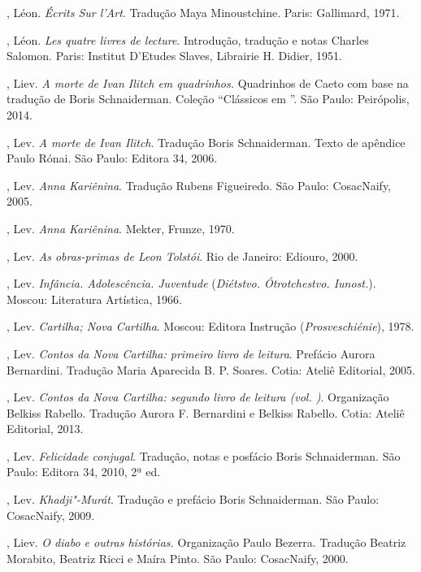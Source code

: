 \begin{Parskip}
{, Léon. \emph{Écrits Sur l'Art}. Tradução Maya Minoustchine. Paris:
Gallimard, 1971.

, Léon. \emph{Les quatre livres de lecture}. Introdução, tradução e notas Charles Salomon. Paris: Institut D'Etudes Slaves, Librairie H. Didier, 1951.

, Liev. \emph{A morte de Ivan Ilitch em quadrinhos.} Quadrinhos de Caeto com base na
tradução de Boris Schnaiderman. Coleção ``Clássicos em ''. São Paulo: Peirópolis, 2014.

, Lev. \emph{A morte de Ivan Ilitch}. Tradução Boris Schnaiderman. Texto de apêndice
Paulo Rónai. São Paulo: Editora 34, 2006.

, Lev. \emph{Anna Kariênina}. Tradução Rubens Figueiredo. São
Paulo: CosacNaify, 2005.

, Lev. \emph{Anna Kariênina}. Mekter, Frunze, 1970.

, Lev. \emph{As obras-primas de Leon Tolstói}. Rio de Janeiro: Ediouro, 2000.

, Lev. \emph{Infância. Adolescência. Juventude} (\emph{Diétstvo. Ótrotchestvo. Iunost.}). Moscou: Literatura Artística, 1966.

, Lev. \emph{Cartilha; Nova Cartilha}. Moscou: Editora Instrução (\emph{Prosveschiénie}), 1978.

, Lev. \emph{Contos da Nova Cartilha: primeiro livro de leitura}. Prefácio Aurora
Bernardini. Tradução Maria Aparecida B. P. Soares. Cotia: Ateliê Editorial, 2005.

, Lev. \emph{Contos da Nova Cartilha: segundo livro de leitura (vol. )}. Organização Belkiss Rabello. Tradução Aurora F. Bernardini e Belkiss Rabello. Cotia: Ateliê Editorial, 2013.

, Lev. \emph{Felicidade conjugal}. Tradução, notas e posfácio Boris Schnaiderman. São
Paulo: Editora 34, 2010, 2ª ed.

, Lev. \emph{Khadji"-Murát}. Tradução e prefácio Boris Schnaiderman. São Paulo: CosacNaify, 2009.

, Liev. \emph{O diabo e outras histórias.} Organização Paulo Bezerra. Tradução Beatriz
Morabito, Beatriz Ricci e Maíra Pinto. São Paulo: CosacNaify, 2000.

}
\end{Parskip}
